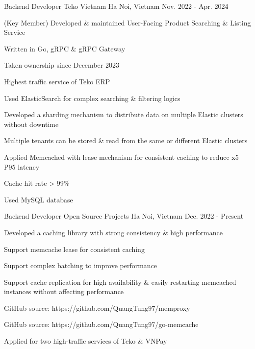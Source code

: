 \begin{cventries}
\cventry
{Backend Developer} %
{Teko Vietnam} %
{Ha Noi, Vietnam} %
{Nov. 2022 - Apr. 2024} %
{ %
\begin{cvitems}
\item{(Key Member) Developed \& maintained User-Facing Product Searching \& Listing Service}
\item{Written in Go, gRPC \& gRPC Gateway}
\item{Taken ownership since December 2023}
\item{Highest traffic service of Teko ERP}
\item{Used ElasticSearch for complex searching \& filtering logics}
\item{Developed a sharding mechanism to distribute data on multiple Elastic clusters without downtime}
\item{Multiple tenants can be stored \& read from the same or different Elastic clusters}
\item{Applied Memcached with lease mechanism for consistent caching to reduce x5 P95 latency}
\item{Cache hit rate > 99\%}
\item{Used MySQL database}
\end{cvitems}
}


\cventry
{Backend Developer} %
{Open Source Projects} %
{Ha Noi, Vietnam} %
{Dec. 2022 - Present} %
{ %
\begin{cvitems}
\item{Developed a caching library with strong consistency \& high performance}
\item{Support memcache lease for consistent caching}
\item{Support complex batching to improve performance}
\item{Support cache replication for high availability \& easily restarting memcached instances without affecting performance}
\item{GitHub source: https://github.com/QuangTung97/memproxy}
\item{GitHub source: https://github.com/QuangTung97/go-memcache}
\item{Applied for two high-traffic services of Teko \& VNPay}
\end{cvitems}
}



\end{cventries}
